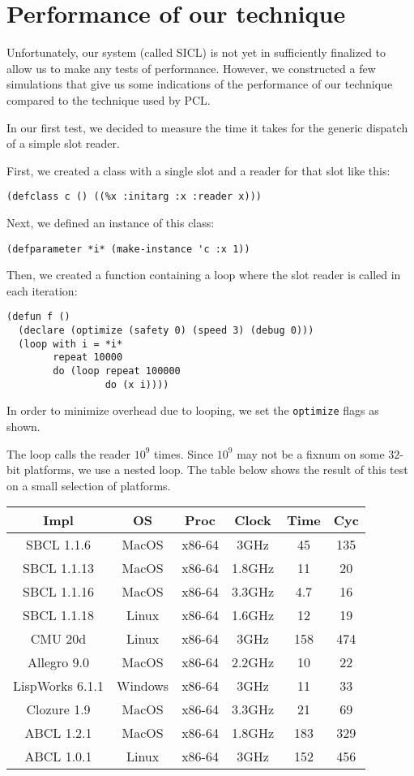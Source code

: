 \section{Performance of our technique}

Unfortunately, our system (called SICL) is not yet in sufficiently
finalized to allow us to make any tests of performance.  However, we
constructed a few simulations that give us some indications of the
performance of our technique compared to the technique used by PCL.

In our first test, we decided to measure the time it takes for the
generic dispatch of a simple slot reader. 

First, we created a class with a single slot and a reader for that
slot like this:

\begin{verbatim}
(defclass c () ((%x :initarg :x :reader x)))  
\end{verbatim}

Next, we defined an instance of this class:

\begin{verbatim}
(defparameter *i* (make-instance 'c :x 1))
\end{verbatim}

Then, we created a function containing a loop where the slot reader is
called in each iteration: 

\begin{verbatim}
(defun f ()
  (declare (optimize (safety 0) (speed 3) (debug 0)))
  (loop with i = *i*
        repeat 10000
        do (loop repeat 100000
                 do (x i))))
\end{verbatim}

In order to minimize overhead due to looping, we set the
\texttt{optimize} flags as shown.

The loop calls the reader $10^9$ times.  Since $10^9$ may not be a
fixnum on some $32$-bit platforms, we use a nested loop.  The table
below shows the result of this test on a small selection of platforms.

{\small\begin{tabular}{|c|c|c|c|c|c|}
\hline
Impl & OS & Proc & Clock & Time & Cyc\\
\hline\hline
SBCL 1.1.6 & MacOS & x86-64 & 3GHz & 45 & 135\\
SBCL 1.1.13 & MacOS & x86-64 & 1.8GHz & 11 & 20 \\
SBCL 1.1.16 & MacOS & x86-64 & 3.3GHz & 4.7 & 16 \\
SBCL 1.1.18 & Linux & x86-64 & 1.6GHz & 12 & 19\\
CMU 20d & Linux & x86-64 & 3GHz & 158 & 474\\
Allegro 9.0 & MacOS & x86-64 & 2.2GHz & 10 & 22\\
LispWorks 6.1.1 & Windows & x86-64 & 3GHz & 11 & 33\\
Clozure 1.9 & MacOS & x86-64 & 3.3GHz & 21 & 69\\
ABCL 1.2.1 & MacOS & x86-64 & 1.8GHz & 183 & 329\\
ABCL 1.0.1 & Linux & x86-64 & 3GHz & 152 & 456\\
\hline
\end{tabular}}

